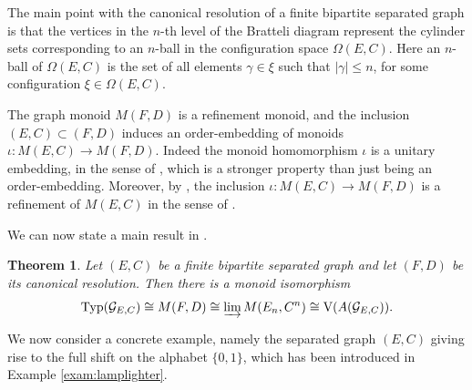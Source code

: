 \documentclass[11pt]{amsart}
\theoremstyle{plain}            %
\newtheorem{theorem}{Theorem}[section]
\theoremstyle{definition}       %
\theoremstyle{definition}       %
\theoremstyle{remark}
\newcommand{\V}{\mathrm{V}}
\newcommand{\Typ}{\mathrm{Typ}}
\begin{document}
The main point with the canonical resolution of a finite bipartite separated graph is that the vertices in the $n$-th level of the Bratteli diagram represent the cylinder sets corresponding to an $n$-ball
in the configuration space $\Omega (E,C)$. Here an $n$-ball of $\Omega (E,C)$ is the set of all elements $\gamma \in \xi$ such that $|\gamma | \le n$, for some configuration $\xi \in \Omega (E,C)$. 

The graph monoid $M(F,D)$ is a refinement monoid, and the inclusion $(E,C) \subset (F,D)$ induces an order-embedding of monoids
$\iota \colon M(E,C) \to M(F,D)$. Indeed the monoid homomorphism $\iota$ is a unitary embedding, in the sense of \cite[Definition 3.7]{ae14}, which is a stronger property than just being an order-embedding. Moreover, by \cite[Lemma 4.5]{ae14}, the inclusion $\iota \colon M(E,C) \to M(F,D)$ is a refinement of $M(E,C)$ in the sense of \cite[Definition 4.3]{ae14}. 

We can now state a main result in \cite{ae14}.

\begin{theorem} {\rm \cite[Theorem 7.4]{ae14}}
	\label{thm:typesemigroup-bipar-separated}
	Let $(E,C)$ be a finite bipartite separated graph and let $(F,D)$ be its canonical resolution. Then there is a monoid isomorphism  $$\Typ (\mathcal G _{E,C})\cong M(F,D) \cong \varinjlim M(E_n,C^n)
    \cong \V (A(\mathcal G_{E,C})).$$ 
	\end{theorem}

We now consider a concrete example, namely the separated graph $(E,C)$ giving rise to the full shift on the alphabet 
$\{0,1\}$, which has been introduced in Example \ref{exam:lamplighter}. 
\end{document}
